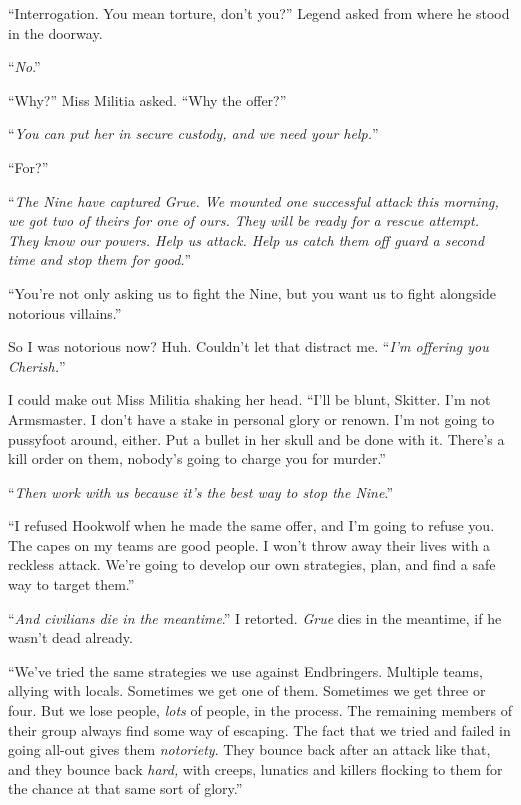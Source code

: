 ``Interrogation.  You mean torture, don't you?'' Legend asked from where he stood in the doorway.



``\emph{No}.''



``Why?''  Miss Militia asked.  ``Why the offer?''



``\emph{You can put her in secure custody, and we need your help.}''



``For?''



``\emph{The Nine have captured Grue.  We mounted one successful attack this morning, we got two of theirs for one of ours.  They will be ready for a rescue attempt.  They know our powers.  Help us attack.  Help us catch them off guard a second time and stop them for good.}''



``You're not only asking us to fight the Nine, but you want us to fight alongside notorious villains.''



So I was notorious now?  Huh.  Couldn't let that distract me.  ``\emph{I'm offering you Cherish.}''



I could make out Miss Militia shaking her head.  ``I'll be blunt, Skitter.  I'm not Armsmaster.  I don't have a stake in personal glory or renown.  I'm not going to pussyfoot around, either.  Put a bullet in her skull and be done with it.  There's a kill order on them, nobody's going to charge you for murder.''



``\emph{Then work with us because it's the best way to stop the Nine}.''



``I refused Hookwolf when he made the same offer, and I'm going to refuse you.  The capes on my teams are good people.  I won't throw away their lives with a reckless attack.  We're going to develop our own strategies, plan, and find a safe way to target them.''



``\emph{And civilians die in the meantime}.''  I retorted.  \emph{Grue} dies in the meantime, if he wasn't dead already.



``We've tried the same strategies we use against Endbringers.  Multiple teams, allying with locals.  Sometimes we get one of them.  Sometimes we get three or four.  But we lose people, \emph{lots} of people, in the process.  The remaining members of their group always find some way of escaping. The fact that we tried and failed in going all-out gives them \emph{notoriety}.  They bounce back after an attack like that, and they bounce back \emph{hard,} with creeps, lunatics and killers flocking to them for the chance at that same sort of glory.''



